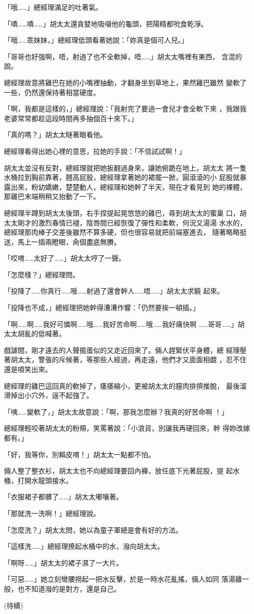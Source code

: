 「哦……」總經理滿足的吐著氣。

「嘖……嘖……」胡太太還貪婪地吸啜他的龜頭，把陽精都吮食乾淨。

「哦……乖妹妹，」總經理低頭看著她說：「妳真是個可人兒。」

「哥哥也好強啊，唔，射過了也不全軟掉，唔……」胡太太嘴裡有東西，
含混的說。

總經理故意將雞巴在她的小嘴裡抽動，才翻身坐到草地上，果然雞巴雖然
變軟了一些，仍然還保持著相當硬度。

「啊，我都是這樣的，」總經理說：「我射完了要過一會兒才會全軟下來
，我跟我老婆常常都趁這段時間再多抽個百十來下。」

「真的嗎？」胡太太瞇著眼看他。

總經理看得出她心裡的意思，拉她的手說：「不信試試啊！」

胡太太並沒有反對，總經理就把她扳翻過身來，讓她俯跪在地上，胡太太
將一隻水桶拉到胸前靠著，翹高屁股，總經理拿著她的裙擺一掀，圓滾滾的小
屁股就暴露出來，粉幼嬌嫩，楚楚動人，總經理和她幹了半天，現在才看見到
她的裸體，那雞巴末端稍稍又抬動了一下。

總經理半蹲到胡太太後頭，右手捏提起晃悠悠的雞巴，尋到胡太太的蜜巢
口，胡太太剛才的激烈春情已褪，陰唇間已經恢復了彈性和柔軟，何況又湯湯
水水的，總經理那肉棒子交差後雖然不算多硬，但也很容易就把前端塞進去，
隨著略略挺送，馬上一插兩瞪眼，肏個盡底無賸。

「哎唷……太好了……」胡太太哼了一聲。

「怎麼樣？」總經理問。

「投降了……你真行……哦……射過了還會幹人……唔……」胡太太求饒
起來。

「投降也不成，」總經理把她幹得漕漕作響：「仍然要挨一頓插。」

「啊……啊……我好可憐啊……哦……我好苦命啊……哦……我好痛快啊
……哥哥……」胡太太胡亂的低喊著。

戲謔間，剛才遠去的人聲搗蛋似的又走近回來了。倆人趕緊伏平身體，總
經理壓著胡太太，警張的斥候著，等那些人經過，再走遠，他們才又面面相覷
，忍不住還是噴笑出來。

總經理的雞巴這回真的軟掉了，痿痿縮小，更被胡太太的膣肉排擠推脫，
最後溜滑掉出小穴外，逞不起強了。

「咦……變軟了，」胡太太故意說：「啊，那我怎麼辦？我真的好苦命啊
！」

總經理輕咬著胡太太的粉頰，笑罵著說：「小浪貨，別讓我再硬回來，幹
得妳改嫁都有。」

「好，我等你，別賴皮唷！」胡太太一點都不怕。

倆人整了整衣衫，胡太太也不向總經理要回內褲，放任底下光著屁股，提
起水桶，打開水龍頭接水。

「衣服裙子都髒了……」胡太太嘟嚷著。

「那就洗一洗啊！」總經理說。

「怎麼洗？」胡太太問，她以為童子軍總是會有好的方法。

「這樣洗……」總經理撩起水桶中的水，潑向胡太太。

「啊呀……」胡太太的裙子濕了一大片。

「可惡……」她立刻彎腰撈起一把水反擊，於是一時水花亂搖，倆人如同
落湯雞一般，也不知道潑的是對方，還是自己。

(待續)










